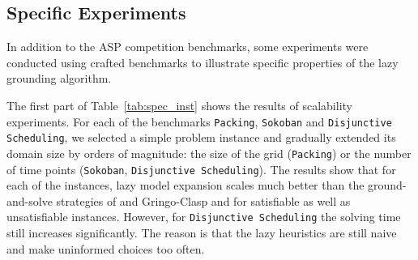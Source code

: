 \documentclass[11pt]{article}
\newcommand{\logicname}[1]{\text{\sc #1}\xspace}
\newcommand{\idp}{\logicname{IDP}}
\theoremstyle{plain}
\theoremstyle{definition}
\theoremstyle{example_basic}
\theoremstyle{example_contd}
\theoremstyle{plain}
\newcommand{\packing}			{\texttt{Packing}\xspace}
\newcommand{\sokoban}			{\texttt{Sokoban}\xspace}
\newcommand{\disjsched}			{\texttt{Disjunctive Scheduling}\xspace}
\begin{document}
\subsection{Specific Experiments}\label{ssec:additionalexper}
In addition to the ASP competition benchmarks, some experiments were conducted using crafted benchmarks to illustrate specific properties of the lazy grounding algorithm.

The first part of Table~\ref{tab:spec_inst} shows the results of scalability experiments. For each of the benchmarks \packing, \sokoban and \disjsched, we selected a  simple problem instance and gradually extended its domain size by orders of magnitude: the size of the grid (\packing) or the number of time points (\sokoban, \disjsched). The results show that for each of the instances, lazy model expansion scales much better than the ground-and-solve strategies of \idp and Gringo-Clasp and for satisfiable as well as unsatisfiable instances. However, for \disjsched the solving time still increases significantly. The reason is that the lazy heuristics are still naive and make uninformed choices too often.
\end{document}
